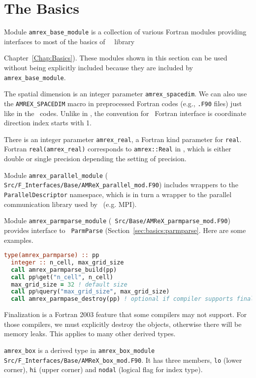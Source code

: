 \section{The Basics}
\label{sec:fi:basics}

Module {\tt amrex\_base\_module} is a collection of various Fortran
modules providing interfaces to most of the basics of \amrex\ \cpp\
library {Chapter~\ref{Chap:Basics}).  These modules shown in this
section can be used without being explicitly included because they are
included by {\tt amrex\_base\_module}.

The spatial dimension is an integer parameter {\tt amrex\_spacedim}.
We can also use the {\tt AMREX\_SPACEDIM} macro in preprocessed
Fortran codes (e.g., {\tt .F90} files) just like in the \cpp\
codes.  Unlike in \cpp, the convention for \amrex\ Fortran interface
is coordinate direction index starts with 1.

There is an integer parameter {\tt amrex\_real}, a Fortran
kind parameter for {\tt real}.  Fortran {\tt real(amrex\_real)}
corresponds to {\tt amrex::Real} in \cpp, which is either double or
single precision depending the setting of precision.

Module {\tt amrex\_parallel\_module} ({\tt
  Src/F\_Interfaces/Base/AMReX\_parallel\_mod.F90}) includes wrappers
to the {\tt ParallelDescriptor} namespace, which is in turn a wrapper
to the parallel communication library used by \amrex\ (e.g. MPI).

Module {\tt amrex\_parmparse\_module} ({\tt
  Src/Base/AMReX\_parmparse\_mod.F90}) provides interface to {\tt
  ParmParse} (Section~\ref{sec:basics:parmparse}.  Here are some
examples.
\begin{lstlisting}[language=fortran]
  type(amrex_parmparse) :: pp
  integer :: n_cell, max_grid_size
  call amrex_parmparse_build(pp)
  call pp%get("n_cell", n_cell)
  max_grid_size = 32 ! default size
  call pp%query("max_grid_size", max_grid_size)
  call amrex_parmpase_destroy(pp) ! optional if compiler supports finalization
\end{lstlisting}
Finalization is a Fortran 2003 feature that some compilers may not
support.  For those compilers, we must explicitly destroy the objects,
otherwise there will be memory leaks.  This applies to many other
derived types.

{\tt amrex\_box} is a derived type in {\tt amrex\_box\_module} {\tt
  Src/F\_Interfaces/Base/AMReX\_box\_mod.F90}.  It has three members,
{\tt lo} (lower corner), {\tt hi} (upper corner) and {\tt nodal}
(logical flag for index type).  

}
